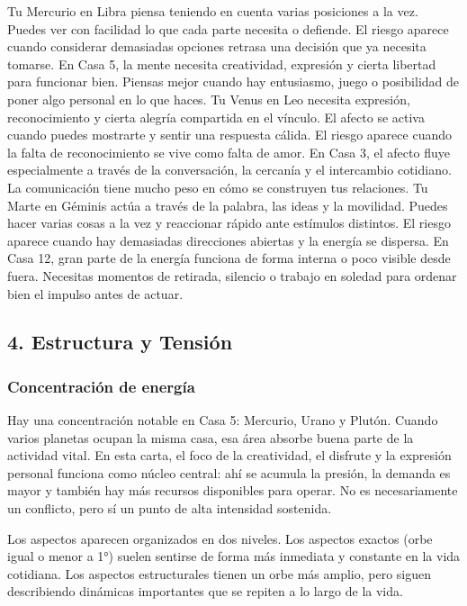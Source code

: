 \documentclass[11pt,a4paper]{article}\usepackage[utf8]{inputenc}
\begin{document}
Tu Mercurio en Libra piensa teniendo en cuenta varias posiciones a la vez. Puedes ver con facilidad lo que cada parte necesita o defiende. El riesgo aparece cuando considerar demasiadas opciones retrasa una decisión que ya necesita tomarse. En Casa 5, la mente necesita creatividad, expresión y cierta libertad para funcionar bien. Piensas mejor cuando hay entusiasmo, juego o posibilidad de poner algo personal en lo que haces. Tu Venus en Leo necesita expresión, reconocimiento y cierta alegría compartida en el vínculo. El afecto se activa cuando puedes mostrarte y sentir una respuesta cálida. El riesgo aparece cuando la falta de reconocimiento se vive como falta de amor. En Casa 3, el afecto fluye especialmente a través de la conversación, la cercanía y el intercambio cotidiano. La comunicación tiene mucho peso en cómo se construyen tus relaciones. Tu Marte en Géminis actúa a través de la palabra, las ideas y la movilidad. Puedes hacer varias cosas a la vez y reaccionar rápido ante estímulos distintos. El riesgo aparece cuando hay demasiadas direcciones abiertas y la energía se dispersa. En Casa 12, gran parte de la energía funciona de forma interna o poco visible desde fuera. Necesitas momentos de retirada, silencio o trabajo en soledad para ordenar bien el impulso antes de actuar.

\subsection{4. Estructura y Tensión}

\subsubsection*{Concentración de energía}

Hay una concentración notable en Casa 5: Mercurio, Urano y Plutón. Cuando varios planetas ocupan la misma casa, esa área absorbe buena parte de la actividad vital. En esta carta, el foco de la creatividad, el disfrute y la expresión personal funciona como núcleo central: ahí se acumula la presión, la demanda es mayor y también hay más recursos disponibles para operar. No es necesariamente un conflicto, pero sí un punto de alta intensidad sostenida.



Los aspectos aparecen organizados en dos niveles. Los aspectos exactos (orbe igual o menor a 1°) suelen sentirse de forma más inmediata y constante en la vida cotidiana. Los aspectos estructurales tienen un orbe más amplio, pero siguen describiendo dinámicas importantes que se repiten a lo largo de la vida.
\end{document}
